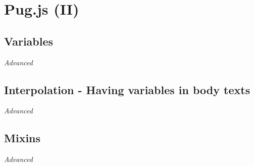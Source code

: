 \chapter{Pug.js (II)}

\section{Variables}

\textit{Advanced}
\vspace{6mm}


\section{Interpolation - Having variables in body texts}

\textit{Advanced}
\vspace{6mm}

\section{Mixins}

\textit{Advanced}
\vspace{6mm}
